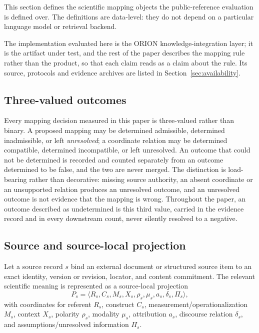 This section defines the scientific mapping objects the public-reference
evaluation is defined over. The definitions are data-level: they do not depend
on a particular language model or retrieval backend.

The implementation evaluated here is the ORION knowledge-integration layer; it
is the artifact under test, and the rest of the paper describes the mapping
rule rather than the product, so that each claim reads as a claim about the
rule. Its source, protocols and evidence archives are listed in
Section~\ref{sec:availability}.

\subsection{Three-valued outcomes}

Every mapping decision measured in this paper is three-valued rather than
binary. A proposed mapping may be determined admissible, determined
inadmissible, or left \emph{unresolved}; a coordinate relation may be
determined compatible, determined incompatible, or left unresolved. An outcome
that could not be determined is recorded and counted separately from an
outcome determined to be false, and the two are never merged. The distinction
is load-bearing rather than decorative: missing source authority, an absent
coordinate or an unsupported relation produces an unresolved outcome, and an
unresolved outcome is not evidence that the mapping is wrong. Throughout the
paper, an outcome described as undetermined is this third value, carried in
the evidence record and in every downstream count, never silently resolved to
a negative.

\subsection{Source and source-local projection}

Let a source record $s$ bind an external document or structured source item to
an exact identity, version or revision, locator, and content commitment. The
relevant scientific meaning is represented as a source-local projection
\begin{equation}
    P_s = \langle R_s, C_s, M_s, X_s, \rho_s, \mu_s, a_s, \delta_s, \Pi_s \rangle,
\end{equation}
with coordinates for referent $R_s$, construct $C_s$,
measurement/operationalization $M_s$, context $X_s$, polarity $\rho_s$,
modality $\mu_s$, attribution $a_s$, discourse relation $\delta_s$, and
assumptions/unresolved information $\Pi_s$.

